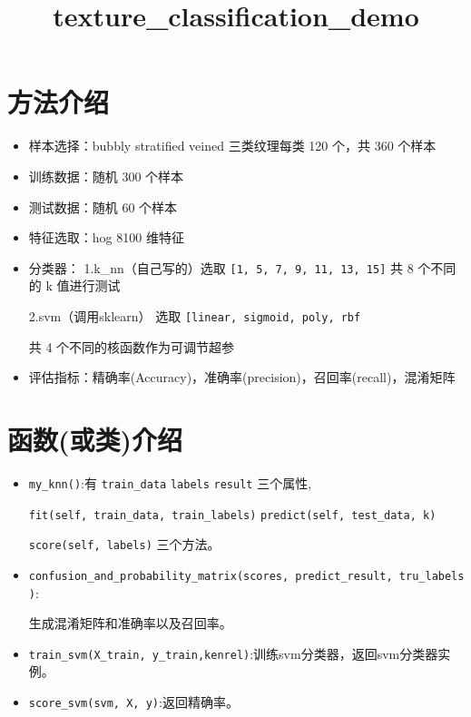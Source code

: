 \documentclass[11pt]{article}
\title{texture\_classification\_demo}
\begin{document}
    
    
    \maketitle
    
    

    
    \hypertarget{ux65b9ux6cd5ux4ecbux7ecd}{%
\section{方法介绍}\label{ux65b9ux6cd5ux4ecbux7ecd}}

\begin{itemize}
\item
  样本选择：bubbly stratified veined 三类纹理每类 120 个，共 360 个样本
\item
  训练数据：随机 300 个样本
\item
  测试数据：随机 60 个样本
\item
  特征选取：hog 8100 维特征
\item
  分类器： 1.k\_nn（自己写的）选取
  \texttt{{[}1,\ 5,\ 7,\ 9,\ 11,\ 13,\ 15{]}} 共 8 个不同的 k 值进行测试

  2.svm（调用sklearn） 选取
  \texttt{{[}\textquotesingle{}linear\textquotesingle{},\ \textquotesingle{}sigmoid\textquotesingle{},\ \textquotesingle{}poly\textquotesingle{},\ \textquotesingle{}rbf\textquotesingle{}{]}}

  共 4 个不同的核函数作为可调节超参
\item
  评估指标：精确率(Accuracy)，准确率(precision)，召回率(recall)，混淆矩阵
\end{itemize}

\hypertarget{ux51fdux6570ux6216ux7c7bux4ecbux7ecd}{%
\section{函数(或类)介绍}\label{ux51fdux6570ux6216ux7c7bux4ecbux7ecd}}

\begin{itemize}
\item
  \texttt{my\_knn()}:有 \texttt{train\_data} \texttt{labels}
  \texttt{result} 三个属性,

  \texttt{fit(self,\ train\_data,\ train\_labels)}
  \texttt{predict(self,\ test\_data,\ k)}

  \texttt{score(self,\ labels)} 三个方法。
\item
  \texttt{confusion\_and\_probability\_matrix(scores,\ predict\_result,\ tru\_labels)}:

  生成混淆矩阵和准确率以及召回率。
\item
  \texttt{train\_svm(X\_train,\ y\_train,kenrel)}:训练svm分类器，返回svm分类器实例。
\item
  \texttt{score\_svm(svm,\ X,\ y)}:返回精确率。
\end{itemize}
\end{document}
